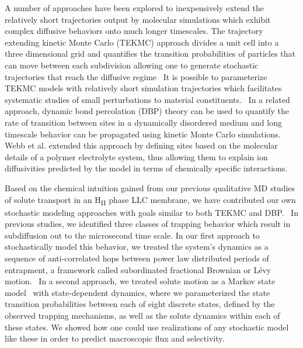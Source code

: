 \documentclass[journal=jpcbfk,manuscript=article]{achemso}
\begin{document}
  A number of approaches have been explored to inexpensively extend the relatively short
  trajectories output by molecular simulations which exhibit complex diffusive behaviors
  onto much longer timescales. The trajectory extending kinetic Monte Carlo (TEKMC) approach
  divides a unit cell into a three dimensional grid and quantifies the transition 
  probabilities of particles that can move between each subdivision allowing one to generate
  stochastic trajectories that reach the diffusive regime~\cite{neyertz_trajectory-extending_2010}
  It is possible to parameterize TEKMC models with relatively short simulation trajectories 
  which facilitates systematic studies of small perturbations to material constituents.~\cite{hanson_computer_2012}
  In a related approach, dynamic bond percolation (DBP) theory can be used to quantify the
  rate of transition between sites in a dynamically disordered medium and long timescale
  behavior can be propagated using kinetic Monte Carlo simulations.~\cite{druger_dynamic_1983}
  Webb et al. extended this approach by defining sites based on the molecular details of 
  a polymer electrolyte system, thus allowing them to explain ion diffusivities predicted by
  the model in terms of chemically specific interactions.~\cite{webb_chemically_2015}

  Based on the chemical intuition gained from our previous qualitative MD studies of 
  solute transport in an H\textsubscript{II} phase LLC membrane, we have contributed our
  own stochastic modeling approaches with goals similar to both TEKMC and DBP.~\cite{coscia_chemically_2019,coscia_capturing_2020}
  In previous studies, we identified three classes of trapping behavior which result in subdiffusion out to the microsecond 
  time scale. In our first approach to stochastically model this behavior, we treated 
  the system's dynamics as a sequence of anti-correlated hops between power law distributed periods of 
  entrapment, a framework called subordinated fractional Brownian or L\'evy
  motion.~\cite{thiel_weak_2014,teuerle_modeling_2013} In a second approach, we treated 
  solute motion as a Markov state model~\cite{pande_everything_2010} with state-dependent
  dynamics, where we parameterized the state transition probabilities between each of
  eight discrete states, defined by the observed trapping mechanisms, as well as the 
  solute dynamics within each of these states. We showed how one could use realizations
  of any stochastic model like these in order to predict macroscopic flux and selectivity. 
  
\end{document}

